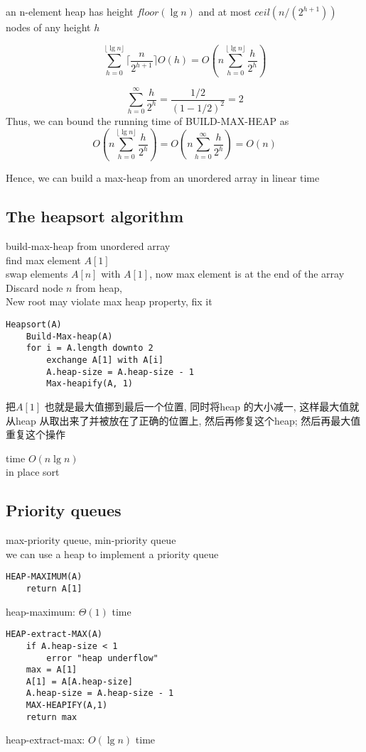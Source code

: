 \documentclass{article}
\begin{document}
an n-element heap has height $floor(\lg n )$ and at most $ceil(n/(2^{h+1}))$ nodes of any height $h$

$$
\sum_{h=0}^{\lfloor \lg n \rfloor} \lceil \frac{n}{2^{h+1}} \rceil O(h)
=
O(n \sum_{h=0}^{\lfloor \lg n \rfloor} \frac{h}{2^h})
$$

$$
\sum_{h=0}^{\infty} \frac{ h}{2^h} = \frac{1/2}{(1 - 1/2)^2} = 2
$$
Thus, we can bound the running time of BUILD-MAX-HEAP as
$$
O(n \sum_{h=0}^{\lfloor \lg n \rfloor} \frac{h}{2^h})
= O(n \sum_{h=0}^{\infty} \frac{h}{2^h})
= O(n)
$$

Hence, we can build a max-heap from an unordered array in linear time

\subsection{The heapsort algorithm}
build-max-heap from unordered array\\
find max element $A[1]$\\
swap elements $A[n]$ with $A[1]$, now max element is at the end of the array\\
Discard node $n$ from heap,\\
New root may violate max heap property, fix it

\begin{verbatim}
Heapsort(A)
    Build-Max-heap(A)
    for i = A.length downto 2
        exchange A[1] with A[i]
        A.heap-size = A.heap-size - 1
        Max-heapify(A, 1)
\end{verbatim}

把$A[1]$ 也就是最大值挪到最后一个位置, 同时将heap 的大小减一, 这样最大值就从heap 从取出来了并被放在了正确的位置上, 然后再修复这个heap; 然后再最大值重复这个操作

time $O(n\lg n )$\\
in place sort

\subsection{Priority queues}
max-priority queue, min-priority queue\\
we can use a heap to implement a priority queue

\begin{verbatim}
HEAP-MAXIMUM(A)
    return A[1]
\end{verbatim}
heap-maximum: $\Theta(1)$ time

\begin{verbatim}
HEAP-extract-MAX(A)
    if A.heap-size < 1
        error "heap underflow"
    max = A[1]
    A[1] = A[A.heap-size]
    A.heap-size = A.heap-size - 1
    MAX-HEAPIFY(A,1)
    return max
\end{verbatim}
heap-extract-max: $O(\lg n )$ time
\end{document}
